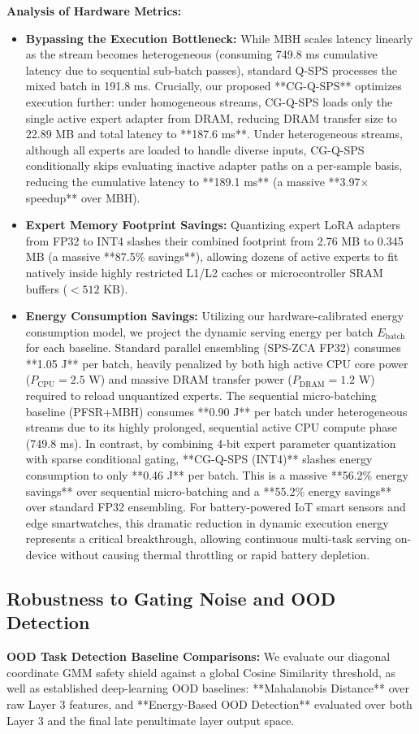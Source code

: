 \textbf{Analysis of Hardware Metrics:}
\begin{itemize}
  \item \textbf{Bypassing the Execution Bottleneck:} While MBH scales latency linearly as the stream becomes heterogeneous (consuming 749.8 ms cumulative latency due to sequential sub-batch passes), standard Q-SPS processes the mixed batch in 191.8 ms. Crucially, our proposed **CG-Q-SPS** optimizes execution further: under homogeneous streams, CG-Q-SPS loads only the single active expert adapter from DRAM, reducing DRAM transfer size to 22.89 MB and total latency to **187.6 ms**. Under heterogeneous streams, although all experts are loaded to handle diverse inputs, CG-Q-SPS conditionally skips evaluating inactive adapter paths on a per-sample basis, reducing the cumulative latency to **189.1 ms** (a massive **3.97$\times$ speedup** over MBH).
  \item \textbf{Expert Memory Footprint Savings:} Quantizing expert LoRA adapters from FP32 to INT4 slashes their combined footprint from 2.76 MB to 0.345 MB (a massive **87.5\% savings**), allowing dozens of active experts to fit natively inside highly restricted L1/L2 caches or microcontroller SRAM buffers ($<512$ KB).
  \item \textbf{Energy Consumption Savings:} Utilizing our hardware-calibrated energy consumption model, we project the dynamic serving energy per batch $E_{\text{batch}}$ for each baseline. Standard parallel ensembling (SPS-ZCA FP32) consumes **1.05 J** per batch, heavily penalized by both high active CPU core power ($P_{\text{CPU}} = 2.5$ W) and massive DRAM transfer power ($P_{\text{DRAM}} = 1.2$ W) required to reload unquantized experts. The sequential micro-batching baseline (PFSR+MBH) consumes **0.90 J** per batch under heterogeneous streams due to its highly prolonged, sequential active CPU compute phase (749.8 ms). In contrast, by combining 4-bit expert parameter quantization with sparse conditional gating, **CG-Q-SPS (INT4)** slashes energy consumption to only **0.46 J** per batch. This is a massive **56.2\% energy savings** over sequential micro-batching and a **55.2\% energy savings** over standard FP32 ensembling. For battery-powered IoT smart sensors and edge smartwatches, this dramatic reduction in dynamic execution energy represents a critical breakthrough, allowing continuous multi-task serving on-device without causing thermal throttling or rapid battery depletion.
\end{itemize}

\subsection{Robustness to Gating Noise and OOD Detection}
\textbf{OOD Task Detection Baseline Comparisons:} We evaluate our diagonal coordinate GMM safety shield against a global Cosine Similarity threshold, as well as established deep-learning OOD baselines: **Mahalanobis Distance** over raw Layer 3 features, and **Energy-Based OOD Detection** \cite{liu2020energy} evaluated over both Layer 3 and the final late penultimate layer output space.

